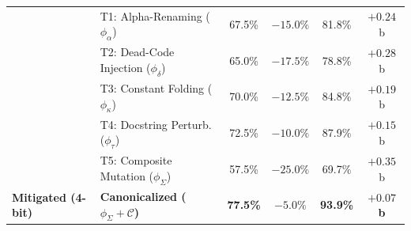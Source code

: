 \begin{table}[t]
{\begin{tabular}{llcccc}
 & T1: Alpha-Renaming ($\phi_\alpha$)      & 67.5\% & $-15.0\%$ & 81.8\% & $+0.24$ b \\
 & T2: Dead-Code Injection ($\phi_\delta$) & 65.0\% & $-17.5\%$ & 78.8\% & $+0.28$ b \\
 & T3: Constant Folding ($\phi_\kappa$)   & 70.0\% & $-12.5\%$ & 84.8\% & $+0.19$ b \\
 & T4: Docstring Perturb. ($\phi_\tau$)    & 72.5\% & $-10.0\%$ & 87.9\% & $+0.15$ b \\
 & T5: Composite Mutation ($\phi_\Sigma$)  & 57.5\% & $-25.0\%$ & 69.7\% & $+0.35$ b \\
\midrule
\textbf{Mitigated (4-bit)} 
 & \textbf{Canonicalized ($\phi_\Sigma + \mathcal{C}$)} & \textbf{77.5\%} & \textbf{$-5.0\%$} & \textbf{93.9\%} & \textbf{$+0.07$ b} \\
\bottomrule
\end{tabular}%
}
\vspace{-2mm}
\end{table}
